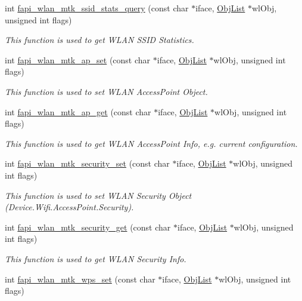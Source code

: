 \begin{DoxyCompactItemize}
int \hyperlink{group__FAPI__WLAN__MTK_gaefaafba9a63bf363c844f1b456529f9b}{fapi\-\_\-wlan\-\_\-mtk\-\_\-ssid\-\_\-stats\-\_\-query} (const char $\ast$iface, \hyperlink{structObjList}{Obj\-List} $\ast$wl\-Obj, unsigned int flags)
\begin{DoxyCompactList}\small\item\em This function is used to get W\-L\-A\-N S\-S\-I\-D Statistics. \end{DoxyCompactList}\item 
int \hyperlink{group__FAPI__WLAN__MTK_ga5bdf8123e40ea7b9ba2fd55b389b9c21}{fapi\-\_\-wlan\-\_\-mtk\-\_\-ap\-\_\-set} (const char $\ast$iface, \hyperlink{structObjList}{Obj\-List} $\ast$wl\-Obj, unsigned int flags)
\begin{DoxyCompactList}\small\item\em This function is used to set W\-L\-A\-N Access\-Point Object. \end{DoxyCompactList}\item 
int \hyperlink{group__FAPI__WLAN__MTK_ga1f8ce919749a5229575658b633824197}{fapi\-\_\-wlan\-\_\-mtk\-\_\-ap\-\_\-get} (const char $\ast$iface, \hyperlink{structObjList}{Obj\-List} $\ast$wl\-Obj, unsigned int flags)
\begin{DoxyCompactList}\small\item\em This function is used to get W\-L\-A\-N Access\-Point Info, e.\-g. current configuration. \end{DoxyCompactList}\item 
int \hyperlink{group__FAPI__WLAN__MTK_ga5415fb361f93510ba11c63c22052a8a0}{fapi\-\_\-wlan\-\_\-mtk\-\_\-security\-\_\-set} (const char $\ast$iface, \hyperlink{structObjList}{Obj\-List} $\ast$wl\-Obj, unsigned int flags)
\begin{DoxyCompactList}\small\item\em This function is used to set W\-L\-A\-N Security Object (Device.\-Wifi.\-Access\-Point.\-Security). \end{DoxyCompactList}\item 
int \hyperlink{group__FAPI__WLAN__MTK_ga3a4145145bf426f0b94c37ab1593efb8}{fapi\-\_\-wlan\-\_\-mtk\-\_\-security\-\_\-get} (const char $\ast$iface, \hyperlink{structObjList}{Obj\-List} $\ast$wl\-Obj, unsigned int flags)
\begin{DoxyCompactList}\small\item\em This function is used to get W\-L\-A\-N Security Info. \end{DoxyCompactList}\item 
int \hyperlink{group__FAPI__WLAN__MTK_ga4a9587395749e39648a991f1390a30a2}{fapi\-\_\-wlan\-\_\-mtk\-\_\-wps\-\_\-set} (const char $\ast$iface, \hyperlink{structObjList}{Obj\-List} $\ast$wl\-Obj, unsigned int flags)

\end{DoxyCompactItemize}
